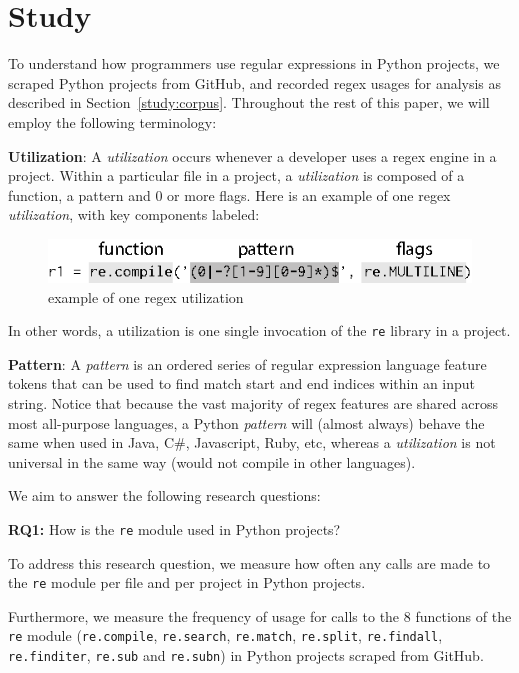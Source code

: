 \section{Study}
\label{sec:study}

To understand how programmers use regular expressions in Python projects, we scraped  Python projects from GitHub, and recorded regex usages for analysis as described in Section~\ref{study:corpus}.
Throughout the rest of this paper, we will employ the following terminology:

\noindent \textbf{Utilization}: A \emph{utilization} occurs whenever a developer uses a regex engine in a project.  Within a particular file in a project, a \emph{utilization} is composed of a function, a pattern and 0 or more flags.  Here is an example of one regex \emph{utilization}, with key components labeled:

\begin{figure}[htb]
\centering
\includegraphics[width=\columnwidth]{../illustrations/exampleUsage.eps}
\caption{example of one regex utilization}
\label{fig:exampleUsage}
\end{figure}

\noindent In other words, a utilization is one single invocation of the {\tt re} library in a project. 

\noindent \textbf{Pattern}: A \emph{pattern} is an ordered series of regular expression language feature tokens that can be used to find match start and end indices within an input string.  Notice that because the vast majority of regex features are shared across most all-purpose languages, a Python \emph{pattern} will (almost always) behave the same when used in Java, C\#, Javascript, Ruby, etc, whereas a \emph{utilization} is not universal in the same way (would not compile in other languages).


We aim to answer the following research questions:

\textbf{RQ1:} How  is the {\tt re} module used in Python projects?

To address this research question, we measure how often any calls are made to the {\tt re} module per file and per project in Python projects.

Furthermore, we measure the frequency of usage for calls to the 8 functions of the {\tt re} module ({\tt re.compile}, {\tt re.search}, {\tt re.match}, {\tt re.split}, {\tt re.findall}, {\tt re.finditer}, {\tt re.sub} and {\tt re.subn}) in Python projects scraped from GitHub.

